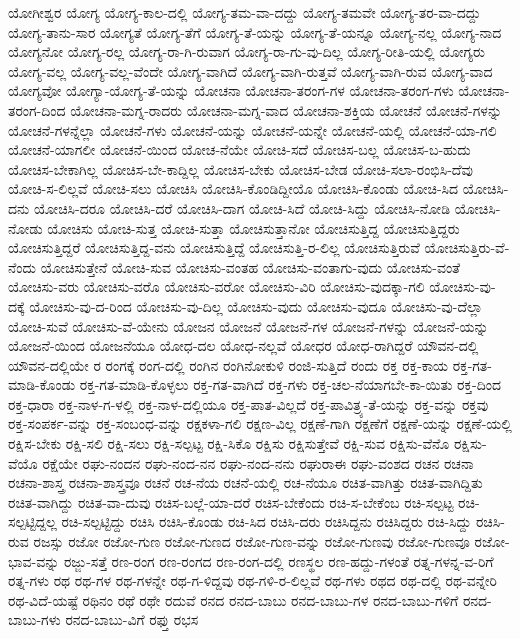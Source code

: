 ಯೋಗೀಶ್ವರ
ಯೋಗ್ಯ
ಯೋಗ್ಯ-ಕಾಲ-ದಲ್ಲಿ
ಯೋಗ್ಯ-ತಮ-ವಾ-ದದ್ದು
ಯೋಗ್ಯ-ತಮವೇ
ಯೋಗ್ಯ-ತರ-ವಾ-ದದ್ದು
ಯೋಗ್ಯ-ತಾನು-ಸಾರ
ಯೋಗ್ಯತೆ
ಯೋಗ್ಯ-ತೆಗೆ
ಯೋಗ್ಯ-ತೆ-ಯನ್ನು
ಯೋಗ್ಯ-ತೆ-ಯನ್ನೂ
ಯೋಗ್ಯ-ನಲ್ಲ
ಯೋಗ್ಯ-ನಾದ
ಯೋಗ್ಯನೋ
ಯೋಗ್ಯ-ರಲ್ಲ
ಯೋಗ್ಯ-ರಾ-ಗಿ-ರುವಾಗ
ಯೋಗ್ಯ-ರಾ-ಗು-ವು-ದಿಲ್ಲ
ಯೋಗ್ಯ-ರೀತಿ-ಯಲ್ಲಿ
ಯೋಗ್ಯರು
ಯೋಗ್ಯ-ವಲ್ಲ
ಯೋಗ್ಯ-ವಲ್ಲ-ವೆಂದೇ
ಯೋಗ್ಯ-ವಾಗಿದೆ
ಯೋಗ್ಯ-ವಾಗಿ-ರುತ್ತವೆ
ಯೋಗ್ಯ-ವಾಗಿ-ರುವ
ಯೋಗ್ಯ-ವಾದ
ಯೋಗ್ಯವೋ
ಯೋಗ್ಯಾ-ಯೋಗ್ಯ-ತೆ-ಯನ್ನು
ಯೋಚನಾ
ಯೋಚನಾ-ತರಂಗ-ಗಳ
ಯೋಚನಾ-ತರಂಗ-ಗಳು
ಯೋಚನಾ-ತರಂಗ-ದಿಂದ
ಯೋಚನಾ-ಮಗ್ನ-ರಾದರು
ಯೋಚನಾ-ಮಗ್ನ-ವಾದ
ಯೋಚನಾ-ಶಕ್ತಿಯ
ಯೋಚನೆ
ಯೋಚನೆ-ಗಳನ್ನು
ಯೋಚನೆ-ಗಳನ್ನೆಲ್ಲಾ
ಯೋಚನೆ-ಗಳು
ಯೋಚನೆ-ಯನ್ನು
ಯೋಚನೆ-ಯನ್ನೇ
ಯೋಚನೆ-ಯಲ್ಲಿ
ಯೋಚನೆ-ಯಾ-ಗಲಿ
ಯೋಚನೆ-ಯಾಗಲೀ
ಯೋಚನೆ-ಯಿಂದ
ಯೋಚ-ನೆಯೇ
ಯೋಚಿ-ಸದೆ
ಯೋಚಿಸ-ಬಲ್ಲ
ಯೋಚಿಸ-ಬ-ಹುದು
ಯೋಚಿಸ-ಬೇಕಾಗಿಲ್ಲ
ಯೋಚಿಸ-ಬೇ-ಕಾದ್ದಿಲ್ಲ
ಯೋಚಿಸ-ಬೇಕು
ಯೋಚಿಸ-ಬೇಡ
ಯೋಚಿ-ಸಲಾ-ರಂಭಿಸಿ-ದೆವು
ಯೋಚಿ-ಸ-ಲಿಲ್ಲವೆ
ಯೋಚಿ-ಸಲು
ಯೋಚಿಸಿ
ಯೋಚಿಸಿ-ಕೊಂಡಿದ್ದೀಯೊ
ಯೋಚಿಸಿ-ಕೊಂಡು
ಯೋಚಿ-ಸಿದ
ಯೋಚಿಸಿ-ದನು
ಯೋಚಿಸಿ-ದರೂ
ಯೋಚಿಸಿ-ದರೆ
ಯೋಚಿಸಿ-ದಾಗ
ಯೋಚಿ-ಸಿದೆ
ಯೋಚಿ-ಸಿದ್ದು
ಯೋಚಿಸಿ-ನೋಡಿ
ಯೋಚಿಸಿ-ನೋಡು
ಯೋಚಿಸು
ಯೋಚಿ-ಸುತ್ತ
ಯೋಚಿ-ಸುತ್ತಾ
ಯೋಚಿಸುತ್ತಾನೋ
ಯೋಚಿಸುತ್ತಿದ್ದ
ಯೋಚಿಸುತ್ತಿದ್ದರು
ಯೋಚಿಸುತ್ತಿದ್ದರೆ
ಯೋಚಿಸುತ್ತಿದ್ದ-ವನು
ಯೋಚಿಸುತ್ತಿದ್ದೆ
ಯೋಚಿಸುತ್ತಿ-ರ-ಲಿಲ್ಲ
ಯೋಚಿಸುತ್ತಿರುವೆ
ಯೋಚಿಸುತ್ತಿರು-ವೆ-ನೆಂದು
ಯೋಚಿಸುತ್ತೇನೆ
ಯೋಚಿ-ಸುವ
ಯೋಚಿಸು-ವಂತಹ
ಯೋಚಿಸು-ವಂತಾಗು-ವುದು
ಯೋಚಿಸು-ವಂತೆ
ಯೋಚಿಸು-ವರು
ಯೋಚಿಸು-ವರೊ
ಯೋಚಿಸು-ವರೋ
ಯೋಚಿಸು-ವಿರಿ
ಯೋಚಿಸು-ವುದಕ್ಕಾ-ಗಲಿ
ಯೋಚಿಸು-ವು-ದಕ್ಕೆ
ಯೋಚಿಸು-ವು-ದ-ರಿಂದ
ಯೋಚಿಸು-ವು-ದಿಲ್ಲ
ಯೋಚಿಸು-ವುದು
ಯೋಚಿಸು-ವುದೂ
ಯೋಚಿಸು-ವು-ದೆಲ್ಲಾ
ಯೋಚಿ-ಸುವೆ
ಯೋಚಿಸು-ವೆ-ಯೇನು
ಯೋಜನ
ಯೋಜನೆ
ಯೋಜನೆ-ಗಳ
ಯೋಜನೆ-ಗಳನ್ನು
ಯೋಜನೆ-ಯನ್ನು
ಯೋಜನೆ-ಯಿಂದ
ಯೋಜನೆಯೂ
ಯೋಧ-ದಲ
ಯೋಧ-ನಲ್ಲವೆ
ಯೋಧರ
ಯೋಧ-ರಾಗಿದ್ದರೆ
ಯೌವನ-ದಲ್ಲಿ
ಯೌವನ-ದಲ್ಲಿಯೇ
ರ
ರಂಗಕ್ಕೆ
ರಂಗ-ದಲ್ಲಿ
ರಂಗಿನ
ರಂಗಿನೋಕುಳಿ
ರಂಜಿ-ಸುತ್ತಿದೆ
ರಂದು
ರಕ್ತ
ರಕ್ತ-ಕಾಯ
ರಕ್ತ-ಗತ-ಮಾಡಿ-ಕೊಂಡು
ರಕ್ತ-ಗತ-ಮಾಡಿ-ಕೊಳ್ಳಲು
ರಕ್ತ-ಗತ-ವಾಗಿದೆ
ರಕ್ತ-ಗಳು
ರಕ್ತ-ಚಲ-ನೆಯಾಗಬೇ-ಕಾ-ಯಿತು
ರಕ್ತ-ದಿಂದ
ರಕ್ತ-ಧಾರಾ
ರಕ್ತ-ನಾಳ-ಗ-ಳಲ್ಲಿ
ರಕ್ತ-ನಾಳ-ದಲ್ಲಿಯೂ
ರಕ್ತ-ಪಾತ-ವಿಲ್ಲದೆ
ರಕ್ತ-ಪಾವಿತ್ರ್ಯ-ತೆ-ಯನ್ನು
ರಕ್ತ-ವನ್ನು
ರಕ್ತವು
ರಕ್ತ-ಸಂಪರ್ಕ-ವನ್ನು
ರಕ್ತ-ಸಂಬಂಧ-ವನ್ನು
ರಕ್ಷಕಳಾ-ಗಲಿ
ರಕ್ಷಣ-ವಿಲ್ಲ
ರಕ್ಷಣೆ-ಗಾಗಿ
ರಕ್ಷಣೆಗೆ
ರಕ್ಷಣೆ-ಯನ್ನು
ರಕ್ಷಣೆ-ಯಲ್ಲಿ
ರಕ್ಷಿಸ-ಬೇಕು
ರಕ್ಷಿ-ಸಲಿ
ರಕ್ಷಿ-ಸಲು
ರಕ್ಷಿ-ಸಲ್ಪಟ್ಟ
ರಕ್ಷಿ-ಸಿಕೊ
ರಕ್ಷಿಸು
ರಕ್ಷಿಸುತ್ತೇವೆ
ರಕ್ಷಿ-ಸುವ
ರಕ್ಷಿಸು-ವೆನೊ
ರಕ್ಷಿಸು-ವೆಯೊ
ರಕ್ಷೆಯೇ
ರಘು-ನಂದನ
ರಘು-ನಂದ-ನನ
ರಘು-ನಂದ-ನನು
ರಘುರಾಈ
ರಘು-ವಂಶದ
ರಚನ
ರಚನಾ
ರಚನಾ-ಶಾಸ್ತ್ರ
ರಚನಾ-ಶಾಸ್ತ್ರವೂ
ರಚನೆ
ರಚ-ನೆಯ
ರಚನೆ-ಯಲ್ಲಿ
ರಚ-ನೆಯೂ
ರಚಿತ-ವಾಗಿತ್ತು
ರಚಿತ-ವಾಗಿದ್ದಿತು
ರಚಿತ-ವಾಗಿದ್ದು
ರಚಿತ-ವಾ-ದುವು
ರಚಿಸ-ಬಲ್ಲೆ-ಯಾ-ದರೆ
ರಚಿಸ-ಬೇಕೆಂದು
ರಚಿ-ಸ-ಬೇಕೆಂಬ
ರಚಿ-ಸಲ್ಪಟ್ಟ
ರಚಿ-ಸಲ್ಪಟ್ಟಿದ್ದಲ್ಲ
ರಚಿ-ಸಲ್ಪಟ್ಟಿದ್ದು
ರಚಿಸಿ
ರಚಿಸಿ-ಕೊಂಡು
ರಚಿ-ಸಿದ
ರಚಿಸಿ-ದರು
ರಚಿಸಿದ್ದನು
ರಚಿಸಿದ್ದರು
ರಚಿ-ಸಿದ್ದು
ರಚಿಸಿ-ರುವ
ರಜಸ್ಸು
ರಜೋ
ರಜೋ-ಗುಣ
ರಜೋ-ಗುಣದ
ರಜೋ-ಗುಣ-ವನ್ನು
ರಜೋ-ಗುಣವು
ರಜೋ-ಗುಣವೂ
ರಜೋ-ಭಾವ-ವನ್ನು
ರಜ್ಜು-ಸತ್ತೆ
ರಣ-ರಂಗ
ರಣ-ರಂಗದ
ರಣ-ರಂಗ-ದಲ್ಲಿ
ರಣಸ್ಥಲ
ರಣ-ಹದ್ದು-ಗಳಂತೆ
ರತ್ನ-ಗಳನ್ನ-ವ-ರಿಗೆ
ರತ್ನ-ಗಳು
ರಥ
ರಥ-ಗಳ
ರಥ-ಗಳನ್ನೇ
ರಥ-ಗ-ಳಿದ್ದವು
ರಥ-ಗಳಿ-ರ-ಲಿಲ್ಲವೆ
ರಥ-ಗಳು
ರಥದ
ರಥ-ದಲ್ಲಿ
ರಥ-ವನ್ನೇರಿ
ರಥ-ವಿದೆ-ಯಷ್ಟೆ
ರಥಿನಂ
ರಥೆ
ರಥೇ
ರದುವೆ
ರನದ
ರನದ-ಬಾಬು
ರನದ-ಬಾಬು-ಗಳ
ರನದ-ಬಾಬು-ಗಳಿಗೆ
ರನದ-ಬಾಬು-ಗಳು
ರನದ-ಬಾಬು-ವಿಗೆ
ರಫ್ತು
ರಭಸ
